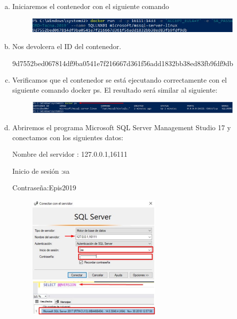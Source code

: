 \documentclass[preprint,12pt]{elsarticle}
\begin{document}
\begin{enumerate}[a)]
\item Iniciaremos el contenedor con el siguiente comando
\begin{figure}[htb]
	\begin{center}
		\includegraphics[width=14cm]{./IMAGENES/Docker07}
	\end{center}
\end{figure}

\item Nos devolcera el ID del contenedor.
\begin{center}
9d7552bed067814df9ba0541e7f216667d361f56add1832bb38ed83fb9fdf9db
\end{center}

\item Verificamos que el contenedor se está ejecutando correctamente con el siguiente comando docker ps. El resultado será similar al siguiente:
\begin{figure}[htb]
	\begin{center}
		\includegraphics[width=14cm]{./IMAGENES/Docker08}
	\end{center}
\end{figure}

\item Abriremos el programa Microsoft SQL Server Management Studio 17 y conectamos con los siguientes datos: 
\begin{center}Nombre del servidor : 127.0.0.1,16111\end{center}
\begin{center} Inicio de sesión :sa\end{center}
\begin{center}Contraseña:Epis2019\end{center}
	\begin{figure}[htb]
		\begin{center}
		\includegraphics[width=6.5cm]{./IMAGENES/Docker13}
		\includegraphics[width=6.5cm]{./IMAGENES/Docker11}
		\end{center}
	\end{figure}


\end{enumerate}
\end{document}
